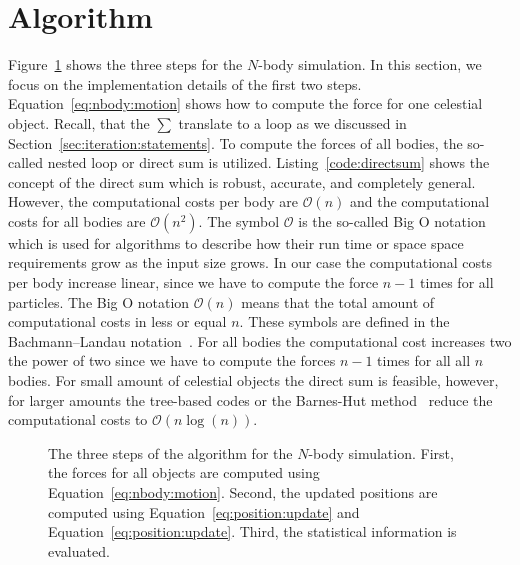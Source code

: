 \documentclass[11pt,fleqn]{book} %
\begin{document}
\section{Algorithm}
Figure~\ref{fig:nbody:algorithm} shows the three steps for the $N$-body simulation. In this section, we focus on the implementation details of the first two steps. Equation~\ref{eq:nbody:motion} shows how to compute the force for one celestial object. Recall, that the $\sum$ translate to a  loop as we discussed in Section~\ref{sec:iteration:statements}. To compute the forces of all bodies, the so-called nested  loop or direct sum is utilized. Listing~\ref{code:directsum} shows the concept of the direct sum which is robust, accurate, and completely general. However, the computational costs per body are $\mathcal{O}(n)$ and the computational costs for all bodies are $\mathcal{O}(n^2)$. The symbol $\mathcal{O}$ is the so-called Big O notation which is used for algorithms to describe how their run time or space space requirements grow as the input size grows. In our case the computational costs per body increase linear, since we have to compute the force $n-1$ times for all particles. The Big O notation $\mathcal{O}(n)$ means that the total amount of computational costs in less or equal $n$. These symbols are defined in the Bachmann–Landau notation~\cite{bachmann1894analytische,landau2000handbuch,knuth1997art}. For all bodies the computational cost increases two the power of two since we have to compute the forces $n-1$ times for all all $n$ bodies. For small amount of celestial objects the direct sum is feasible, however, for larger amounts the tree-based codes or the Barnes-Hut method~\cite{barnes1986hierarchical} reduce the computational costs to $\mathcal{O}(n\log(n))$. \\

\begin{figure}[tb]
\centering
{}
\caption{The three steps of the algorithm for the $N$-body simulation. First, the forces for all objects are computed using Equation~\ref{eq:nbody:motion}. Second, the updated positions are computed using Equation~\ref{eq:position:update} and Equation~\ref{eq:position:update}. Third, the statistical information is evaluated.  }
\label{fig:nbody:algorithm}
\end{figure}
\end{document}

